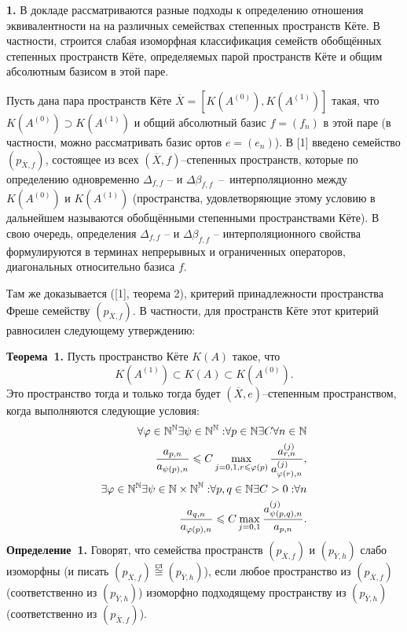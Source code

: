 

\vzmscaption
{\bf 1. }В докладе рассматриваются разные подходы к определению отношения эквивалентности на на различных семействах степенных пространств Кёте. В частности, строится слабая изоморфная классификация семейств обобщённых степенных пространств Кёте,
определяемых парой пространств Кёте и общим абсолютным базисом в этой паре.

Пусть дана пара пространств Кёте  $\overline{X}=[K(A^{(0)}),K(A^{(1)})]$ такая, что
$K(A^{(0)})\supset K(A^{(1)})$ и общий абсолютный базис $f=(f_n)$ в этой паре (в частности, можно
рассматривать базис ортов $e=(e_n)$). В [1] введено семейство $(p_{\overline{X},f})$, состоящее из
всех $(\overline{X},f)$--степенных пространств, которые по определению одновременно $\Delta_{f,f}$ -- и
$\Delta\beta _{f,f}$~--~интерполяционно между $K(A^{(0)})$ и $K(A^{(1)})$ (пространства, удовлетворяющие
этому условию в дальнейшем называются обобщёнными степенными пространствами Кёте). В свою очередь,
определения $\Delta_{f,f}$ -- и $\Delta\beta _{f,f}$ -- интерполяционного свойства формулируются в
терминах непрерывных и ограниченных операторов, диагональных относительно базиса $f$.

Там же доказывается ([1], теорема 2), критерий принадлежности пространства Фреше семейству
$(p_{\overline{X},f})$. В частности, для пространств Кёте этот
критерий равносилен следующему утверждению:

\noindent\textbf{Теорема~1.}
Пусть пространство Кёте $K(A)$ такое, что 
$$K(A^{(1)})\subset K(A)\subset K(A^{(0)}).$$ Это пространство
тогда и только тогда будет $(\overline{X},e)$--степенным пространством, когда
выполняются следующие условия:
\begin{eqnarray*}
\forall{\varphi \in {\Bbb N}^{\Bbb N}}\exists{\psi \in {\Bbb N}^{\Bbb N}:}
\forall{p\in {\Bbb N}}\exists{C}\forall{n \in {\Bbb N}}\\
\dfrac{a_{p,n}}{a_{\psi(p),n}}\leqslant C
\max\limits_{j=0,1,r\leqslant \varphi(p)}
\dfrac{a^{(j)}_{r,n}}{a^{(j)}_{\varphi (r),n}}, \\
\exists{\varphi \in {\Bbb N}^{\Bbb N}}\exists{\psi \in {\Bbb N\times {\Bbb N}}^{\Bbb N}:}
\forall{p,q\in {\Bbb N}}\exists{C>0:}\forall{n}\\
\dfrac{a_{q,n}}{a_{\varphi (p),n}}\leqslant C
\max\limits_{j=0,1}
\dfrac{a^{(j)}_{\psi(p,q),n}}{a_{p,n}}.
\end{eqnarray*}
\noindent\textbf{Определение~1.}
Говорят, что семейства про\-странств $(p_{\overline{X},f})$ и $(p_{\overline{Y},h})$ слабо изоморфны
(и писать 
$(p_{\overline{X},f})\stackrel{\text{сл}}{\cong}(p_{\overline{Y},h})$), если любое пространство  из
$(p_{\overline{X},f})$ (соответственно из $(p_{\overline{Y},h})$) изоморфно подходящему пространству из
$(p_{\overline{Y},h})$ (соответственно из $(p_{\overline{X},f})$).


